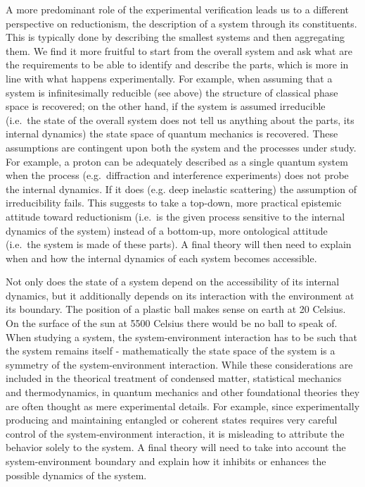 \documentclass{article}
\begin{document}
A more predominant role of the experimental verification leads us to a different perspective on reductionism, the description of a system through its constituents. This is typically done by describing the smallest systems and then aggregating them. We find it more fruitful to start from the overall system and ask what are the requirements to be able to identify and describe the parts, which is more in line with what happens experimentally. For example, when assuming that a system is infinitesimally reducible (see above) the structure of classical phase space is recovered; on the other hand, if the system is assumed irreducible (i.e.~the state of the overall system does not tell us anything about the parts, its internal dynamics) the state space of quantum mechanics is recovered. These assumptions are contingent upon both the system and the processes under study. For example, a proton can be adequately described as a single quantum system when the process (e.g.~diffraction and interference experiments) does not probe the internal dynamics. If it does (e.g. deep inelastic scattering) the assumption of irreducibility fails. This suggests to take a top-down, more practical epistemic attitude toward reductionism (i.e.~is the given process sensitive to the internal dynamics of the system) instead of a bottom-up, more ontological attitude (i.e.~the system is made of these parts). A final theory will then need to explain when and how the internal dynamics of each system becomes accessible.

Not only does the state of a system depend on the accessibility of its internal dynamics, but it additionally depends on its interaction with the environment at its boundary. The position of a plastic ball makes sense on earth at 20 Celsius. On the surface of the sun at 5500 Celsius there would be no ball to speak of. When studying a system, the system-environment interaction has to be such that the system remains itself - mathematically the state space of the system is a symmetry of the system-environment interaction. While these considerations are included in the theorical treatment of condensed matter, statistical mechanics and thermodynamics, in quantum mechanics and other foundational theories they are often thought as mere experimental details. For example, since experimentally producing and maintaining entangled or coherent states requires very careful control of the system-environment interaction, it is misleading to attribute the behavior solely to the system. A final theory will need to take into account the system-environment boundary and explain how it inhibits or enhances the possible dynamics of the system.
\end{document}
